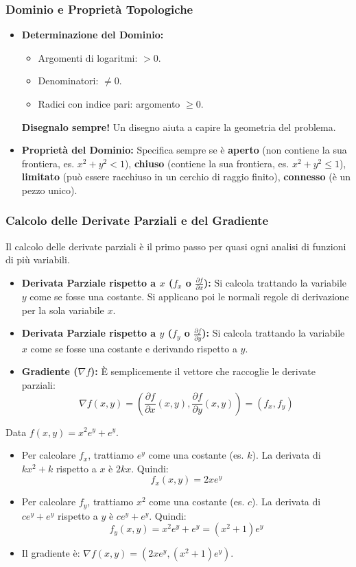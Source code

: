 \documentclass[a4paper, 12pt]{article}
\begin{document}
\subsubsection{Dominio e Proprietà Topologiche}
\begin{itemize}
    \item \textbf{Determinazione del Dominio:} 
    \begin{itemize}
        \item Argomenti di logaritmi: $> 0$. 
        \item Denominatori: $\neq 0$. 
        \item Radici con indice pari: argomento $\ge 0$. 
    \end{itemize}
    \textbf{Disegnalo sempre!} Un disegno aiuta a capire la geometria del problema.
    \item \textbf{Proprietà del Dominio:} Specifica sempre se è \textbf{aperto} (non contiene la sua frontiera, es. $x^2+y^2 < 1$), \textbf{chiuso} (contiene la sua frontiera, es. $x^2+y^2 \le 1$), \textbf{limitato} (può essere racchiuso in un cerchio di raggio finito), \textbf{connesso} (è un pezzo unico). 
\end{itemize}

\subsubsection{Calcolo delle Derivate Parziali e del Gradiente}
Il calcolo delle derivate parziali è il primo passo per quasi ogni analisi di funzioni di più variabili.
\begin{itemize}
    \item \textbf{Derivata Parziale rispetto a $x$ ($f_x$ o $\frac{\partial f}{\partial x}$):} Si calcola trattando la variabile $y$ come se fosse una costante. Si applicano poi le normali regole di derivazione per la sola variabile $x$. 
    \item \textbf{Derivata Parziale rispetto a $y$ ($f_y$ o $\frac{\partial f}{\partial y}$):} Si calcola trattando la variabile $x$ come se fosse una costante e derivando rispetto a $y$. 
    \item \textbf{Gradiente ($\nabla f$):} È semplicemente il vettore che raccoglie le derivate parziali: 
    \[ \nabla f(x,y) = \left( \frac{\partial f}{\partial x}(x,y), \frac{\partial f}{\partial y}(x,y) \right) = (f_x, f_y) \]
\end{itemize}

\begin{esempio}
Data $f(x,y) = x^2e^y + e^y$. 
\begin{itemize}
    \item Per calcolare $f_x$, trattiamo $e^y$ come una costante (es. $k$). La derivata di $kx^2+k$ rispetto a $x$ è $2kx$. Quindi:
    \[ f_x(x,y) = 2xe^y \]
    \item Per calcolare $f_y$, trattiamo $x^2$ come una costante (es. $c$). La derivata di $ce^y+e^y$ rispetto a $y$ è $ce^y+e^y$. Quindi:
    \[ f_y(x,y) = x^2e^y + e^y = (x^2+1)e^y \]
    \item Il gradiente è: $\nabla f(x,y) = (2xe^y, (x^2+1)e^y)$.
\end{itemize}
\end{esempio}
\end{document}
